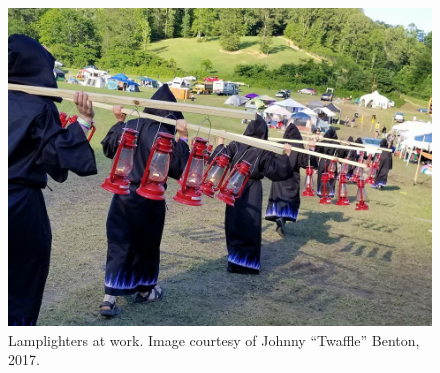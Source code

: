 \vfill
\begin{figure}[H]
\includegraphics[width=\textwidth]{images/filler-images/lamplighters.jpeg}
\caption{Lamplighters at work. Image courtesy of Johnny “Twaffle” Benton, 2017.}
\label{fig:lamplighters2017}
\end{figure}









% 



